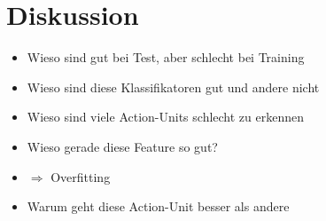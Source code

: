 \chapter{Diskussion}
\begin{itemize}
  \item Wieso sind gut bei Test, aber schlecht bei Training 
  \item Wieso sind diese Klassifikatoren gut und andere nicht
   \item Wieso sind viele Action-Units schlecht zu erkennen
   \item Wieso gerade diese Feature so gut?
  \item $\Rightarrow$ Overfitting
  \item Warum geht diese Action-Unit besser als andere
\end{itemize}



